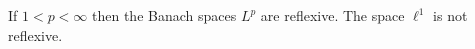 If $1 < p < \infty$ then the Banach spaces $L^p$ are reflexive. The space $\ell^1$ is not reflexive.
